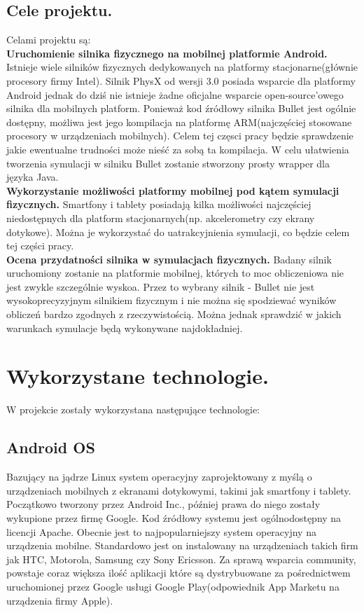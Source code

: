 \subsection{Cele projektu.}\label{subsec:celeProjektu}
Celami projektu są:\\
\textbf{Uruchomienie silnika fizycznego na mobilnej platformie Android.}
Istnieje wiele silników fizycznych dedykowanych na platformy
stacjonarne(głównie procesory firmy Intel). Silnik PhysX od wersji 3.0
posiada wsparcie dla platformy Android jednak do dziś nie istnieje żadne
oficjalne wsparcie open-source'owego silnika dla mobilnych platform. Ponieważ
kod źródłowy silnika Bullet jest ogólnie dostępny, możliwa jest jego kompilacja
na platformę ARM(najczęściej stosowane procesory w urządzeniach mobilnych).
Celem tej częsci pracy będzie sprawdzenie jakie ewentualne trudności może nieść
za sobą ta kompilacja. W celu ułatwienia tworzenia symulacji w silniku Bullet
zostanie stworzony prosty wrapper dla języka Java.\\
\textbf{Wykorzystanie możliwości platformy mobilnej pod kątem symulacji
fizycznych.} Smartfony i tablety posiadają kilka możliwości
najczęściej niedostępnych dla platform stacjonarnych(np. akcelerometry czy
ekrany dotykowe). Można je wykorzystać do uatrakcyjnienia symulacji, co
będzie celem tej części pracy.\\
\textbf{Ocena przydatności silnika w symulacjach fizycznych.} Badany
silnik uruchomiony zostanie na platformie mobilnej, których to moc obliczeniowa
nie jest zwykle szczególnie wyskoa. Przez to wybrany silnik - Bullet nie jest
wysokoprecyzyjnym silnikiem fizycznym i nie można się spodziewać wyników
obliczeń bardzo zgodnych z rzeczywistością. Można jednak sprawdzić w jakich
warunkach symulacje będą wykonywane najdokładniej.
  \newpage
  \section{Wykorzystane technologie.}
  W projekcie zostały wykorzystana następujące technologie:
  \subsection{Android OS}
Bazujący na jądrze Linux system operacyjny zaprojektowany z myślą o
urządzeniach mobilnych z ekranami dotykowymi, takimi jak smartfony i tablety.
Początkowo tworzony przez Android Inc., później prawa do niego zostały wykupione
przez firmę Google. Kod źródłowy systemu jest ogólnodostępny na licencji Apache. 
Obecnie jest to najpopularniejszy system operacyjny na urządzenia mobilne.
Standardowo jest on instalowany na urządzeniach takich firm jak HTC, Motorola,
Samsung czy Sony Ericsson. Za sprawą wsparcia community, powstaje coraz większa
ilość aplikacji które są dystrybuowane za pośrednictwem uruchomionej przez
Google usługi Google Play(odpowiednik App Marketu na urządzenia firmy Apple).
